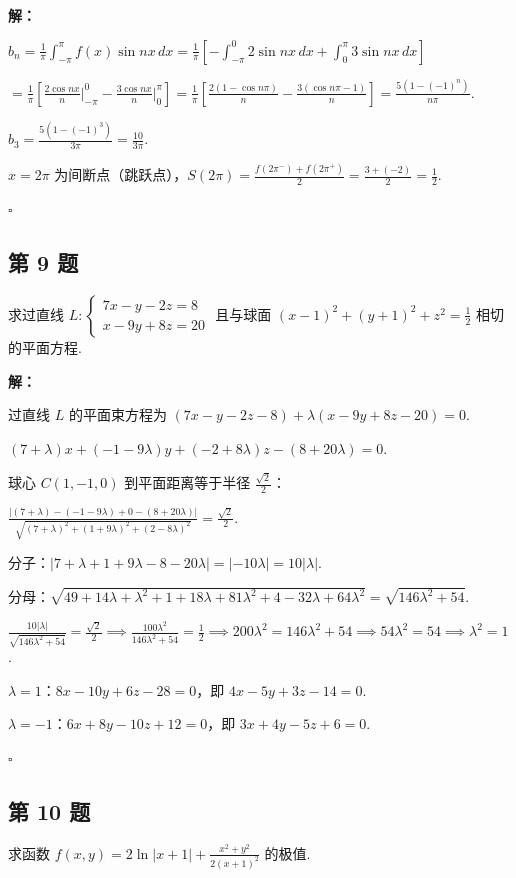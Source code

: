 \documentclass[12pt,a4paper]{article}
\newenvironment{sol}[1][解]{%
  \par\medskip\noindent\textbf{#1：}\itshape\par\noindent\ignorespaces
}{%
  \par\hfill$\square$\par\medskip
}
\begin{document}
\begin{sol}$b_n=\frac{1}{\pi}\int_{-\pi}^{\pi}f(x)\sin
  nx\,dx=\frac{1}{\pi}\left[-\int_{-\pi}^0 2\sin
  nx\,dx+\int_0^{\pi}3\sin nx\,dx\right]$

  $=\frac{1}{\pi}\left[\frac{2\cos nx}{n}\Big|_{-\pi}^0-\frac{3\cos
  nx}{n}\Big|_0^{\pi}\right]=\frac{1}{\pi}\left[\frac{2(1-\cos
  n\pi)}{n}-\frac{3(\cos n\pi-1)}{n}\right]=\frac{5(1-(-1)^n)}{n\pi}.$

  $b_3=\frac{5(1-(-1)^3)}{3\pi}=\frac{10}{3\pi}.$

  $x=2\pi$
  为间断点（跳跃点），$S(2\pi)=\frac{f(2\pi^-)+f(2\pi^+)}{2}=\frac{3+(-2)}{2}=\frac{1}{2}.$

\end{sol}
\subsection*{第 9 题}
求过直线 $L:
\begin{cases}7x-y-2z=8 \\ x-9y+8z=20
\end{cases}$ 且与球面 $(x-1)^2+(y+1)^2+z^2=\frac{1}{2}$ 相切的平面方程.

\begin{sol}过直线 $L$ 的平面束方程为 $(7x-y-2z-8)+\lambda(x-9y+8z-20)=0$.

  $(7+\lambda)x+(-1-9\lambda)y+(-2+8\lambda)z-(8+20\lambda)=0$.

  球心 $C(1,-1,0)$ 到平面距离等于半径 $\frac{\sqrt{2}}{2}$：

  $\frac{|(7+\lambda)-(-1-9\lambda)+0-(8+20\lambda)|}{\sqrt{(7+\lambda)^2+(1+9\lambda)^2+(2-8\lambda)^2}}=\frac{\sqrt{2}}{2}.$

  分子：$|7+\lambda+1+9\lambda-8-20\lambda|=|-10\lambda|=10|\lambda|$.

  分母：$\sqrt{49+14\lambda+\lambda^2+1+18\lambda+81\lambda^2+4-32\lambda+64\lambda^2}=\sqrt{146\lambda^2+54}.$

  $\frac{10|\lambda|}{\sqrt{146\lambda^2+54}}=\frac{\sqrt{2}}{2}\implies\frac{100\lambda^2}{146\lambda^2+54}=\frac{1}{2}\implies
  200\lambda^2=146\lambda^2+54\implies 54\lambda^2=54\implies\lambda^2=1$.

  $\lambda=1$：$8x-10y+6z-28=0$，即 $4x-5y+3z-14=0$.

  $\lambda=-1$：$6x+8y-10z+12=0$，即 $3x+4y-5z+6=0$.

\end{sol}
\subsection*{第 10 题}
求函数 $f(x,y)=2\ln|x+1|+\frac{x^2+y^2}{2(x+1)^2}$ 的极值.
\end{document}
